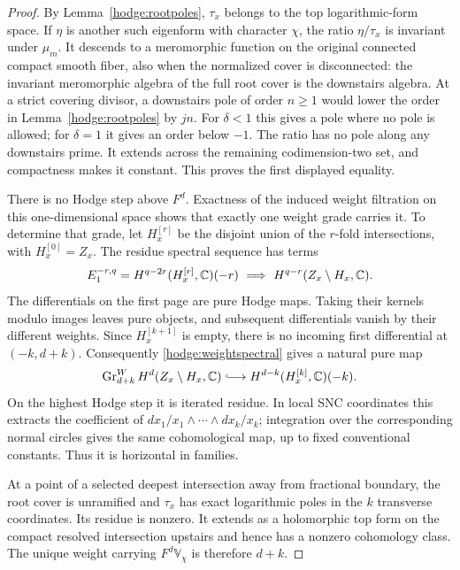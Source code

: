 \begin{proof}
By Lemma~\ref{hodge:rootpoles}, \(\tau_x\) belongs to the top
logarithmic-form space.  If \(\eta\) is another such eigenform with
character \(\chi\), the ratio \(\eta/\tau_x\) is invariant under
\(\mu_m\).  It descends to a meromorphic function on the original
connected compact smooth fiber, also when the normalized cover is
disconnected: the invariant meromorphic algebra of the full root
cover is the downstairs algebra.  At a strict covering divisor, a
downstairs pole of order \(n\geq1\) would lower the order in
Lemma~\ref{hodge:rootpoles} by \(jn\).  For \(\delta<1\) this gives a
pole where no pole is allowed; for \(\delta=1\) it gives an order
below \(-1\).  The ratio has no pole along any downstairs prime.
It extends across the remaining codimension-two set, and compactness
makes it constant.  This proves the first displayed equality.

There is no Hodge step above \(F^d\).  Exactness of the induced
weight filtration on this one-dimensional space shows that exactly
one weight grade carries it.  To determine that grade, let
\(H_x^{[r]}\) be the disjoint union of the \(r\)-fold intersections,
with \(H_x^{[0]}=Z_x\).  The residue spectral sequence has terms
\begin{equation}
 E_1^{-r,q}
   =H^{q-2r}(H_x^{[r]},\mathbb C)(-r)
 \ \Longrightarrow\ H^{q-r}(Z_x\setminus H_x,\mathbb C).
 \label{hodge:weightspectral}
\end{equation}
The differentials on the first page are pure Hodge maps.  Taking
their kernels modulo images leaves pure objects, and subsequent
differentials vanish by their different weights.  Since
\(H_x^{[k+1]}\) is empty, there is no incoming first differential at
\((-k,d+k)\).  Consequently \eqref{hodge:weightspectral} gives a
natural pure map
\begin{equation}
 \Gr^W_{d+k}H^d(Z_x\setminus H_x,\C)
 \lhook\joinrel\longrightarrow
 H^{d-k}(H_x^{[k]},\C)(-k).
 \label{hodge:residuemap}
\end{equation}
On the highest Hodge step it is iterated residue.  In local SNC
coordinates this extracts the coefficient of
\(dx_1/x_1\wedge\cdots\wedge dx_k/x_k\); integration over the
corresponding normal circles gives the same cohomological map,
up to fixed conventional constants.  Thus it is horizontal in
families.

At a point of a selected deepest intersection away from fractional
boundary, the root cover is unramified and \(\tau_x\) has exact
logarithmic poles in the \(k\) transverse coordinates.  Its residue
is nonzero.  It extends as a holomorphic top form on the compact
resolved intersection upstairs and hence has a nonzero cohomology
class.  The unique weight carrying \(F^d\mathbb V_\chi\) is therefore
\(d+k\).


\end{proof}
